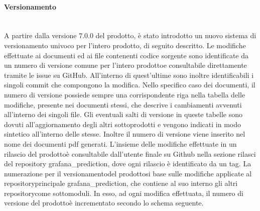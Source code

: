 		\paragraph{Versionamento}\mbox{}\\ [1mm]
		A partire dalla versione 7.0.0 del prodotto, è stato introdotto un nuovo sistema di versionamento univoco per l'intero prodotto\glo, di seguito descritto.
		\newline
		Le modifiche effettuate ai documenti ed ai file contenenti codice sorgente sono identificate da un numero di versione comune per l'intero prodotto\glosp e consultabile direttamente tramite le issue su GitHub. All'interno di quest'ultime sono inoltre identificabili i singoli commit che compongono la modifica.
		\newline
		Nello specifico caso dei documenti, il numero di versione possiede sempre una corrispondente riga nella tabella delle modifiche, presente nei documenti stessi, che descrive i cambiamenti avvenuti all'interno dei singoli file. Gli eventuali salti di versione in queste tabelle sono dovuti all'aggiornamento degli altri sottoprodotti e vengono indicati in modo sintetico all'interno delle stesse. Inoltre il numero di versione viene inserito nel nome dei documenti pdf generati.
		\newline
		L'insieme delle modifiche effettuate in un rilascio del prodotto\glosp è consultabile dall'utente finale su Github nella sezione rilasci del repository grafana\_prediction, dove ogni rilascio è identificato da un tag.
		\newline
		La numerazione per il versionamento\glosp del prodotto\glosp si base sulle modifiche applicate al repository\glosp principale grafana\_prediction, che contiene al suo interno gli altri repository\glosp come sottomoduli. In esso, ad ogni modifica effettuata, il numero di versione del prodotto\glosp è incrementato secondo lo schema seguente.
		
